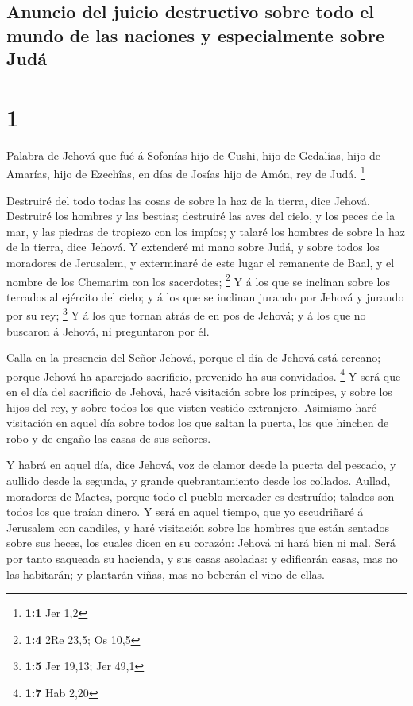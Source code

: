 \hypertarget{anuncio-del-juicio-destructivo-sobre-todo-el-mundo-de-las-naciones-y-especialmente-sobre-juduxe1}{%
\subsection{Anuncio del juicio destructivo sobre todo el mundo de las
naciones y especialmente sobre
Judá}\label{anuncio-del-juicio-destructivo-sobre-todo-el-mundo-de-las-naciones-y-especialmente-sobre-juduxe1}}

\hypertarget{section}{%
\section{1}\label{section}}

 Palabra de Jehová que fué á Sofonías hijo de Cushi, hijo
de Gedalías, hijo de Amarías, hijo de Ezechîas, en días de Josías hijo
de Amón, rey de Judá. \footnote{\textbf{1:1} Jer 1,2}

 Destruiré del todo todas las cosas de sobre la haz de la
tierra, dice Jehová.  Destruiré los hombres y las bestias;
destruiré las aves del cielo, y los peces de la mar, y las piedras de
tropiezo con los impíos; y talaré los hombres de sobre la haz de la
tierra, dice Jehová.  Y extenderé mi mano sobre Judá, y
sobre todos los moradores de Jerusalem, y exterminaré de este lugar el
remanente de Baal, y el nombre de los Chemarim con los sacerdotes;
\footnote{\textbf{1:4} 2Re 23,5; Os 10,5}  Y á los que se
inclinan sobre los terrados al ejército del cielo; y á los que se
inclinan jurando por Jehová y jurando por su rey; \footnote{\textbf{1:5}
  Jer 19,13; Jer 49,1}  Y á los que tornan atrás de en pos
de Jehová; y á los que no buscaron á Jehová, ni preguntaron por él.

 Calla en la presencia del Señor Jehová, porque el día de
Jehová está cercano; porque Jehová ha aparejado sacrificio, prevenido ha
sus convidados. \footnote{\textbf{1:7} Hab 2,20}  Y será
que en el día del sacrificio de Jehová, haré visitación sobre los
príncipes, y sobre los hijos del rey, y sobre todos los que visten
vestido extranjero.  Asimismo haré visitación en aquel día
sobre todos los que saltan la puerta, los que hinchen de robo y de
engaño las casas de sus señores.

 Y habrá en aquel día, dice Jehová, voz de clamor desde
la puerta del pescado, y aullido desde la segunda, y grande
quebrantamiento desde los collados.  Aullad, moradores de
Mactes, porque todo el pueblo mercader es destruído; talados son todos
los que traían dinero.  Y será en aquel tiempo, que yo
escudriñaré á Jerusalem con candiles, y haré visitación sobre los
hombres que están sentados sobre sus heces, los cuales dicen en su
corazón: Jehová ni hará bien ni mal.  Será por tanto
saqueada su hacienda, y sus casas asoladas: y edificarán casas, mas no
las habitarán; y plantarán viñas, mas no beberán el vino de ellas.

